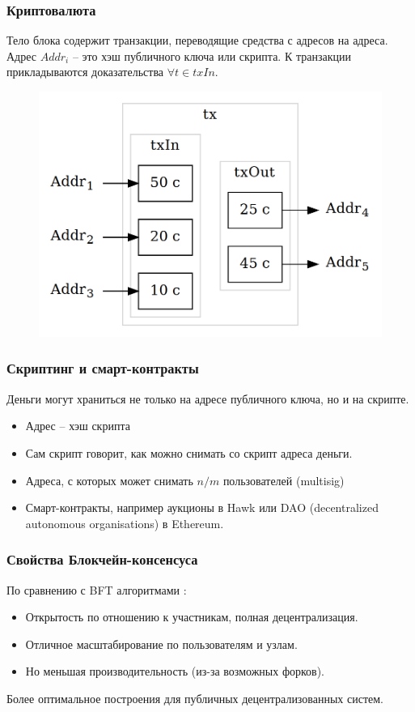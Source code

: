 \documentclass[11pt,handout,pdf,hyperref={unicode}]{beamer}
\begin{document}
\begin{frame}
  \frametitle{Криптовалюта}

  Тело блока содержит транзакции, переводящие средства с адресов на
  адреса. Адрес $Addr_i$ -- это хэш публичного ключа или скрипта. К
  транзакции прикладываются доказательства $\forall t \in txIn$.

  \begin{figure}[t]
  \includegraphics[scale=0.2]{tx_example}
  \centering
  \end{figure}
\end{frame}

\begin{frame}
  \frametitle{Скриптинг и смарт-контракты}

  Деньги могут храниться не только на адресе публичного ключа, но и на скрипте.
  \begin{itemize}
  \item Адрес -- хэш скрипта
  \item Сам скрипт говорит, как можно снимать со скрипт адреса деньги.
  \item Адреса, с которых может снимать $n/m$ пользователей (multisig)
  \item Смарт-контракты, например аукционы в Hawk \parencite{kosba2016hawk}
    или DAO (decentralized autonomous organisations) в Ethereum.
  \end{itemize}
\end{frame}


\begin{frame}
  \frametitle{Свойства Блокчейн-консенсуса}
  По сравнению с BFT алгоритмами \parencite{powbftquest}:
  \begin{itemize}
  \item Открытость по отношению к участникам, полная децентрализация.
  \item Отличное масштабирование по пользователям и узлам.
  \item Но меньшая производительность (из-за возможных форков).
  \end{itemize}

  Более оптимальное построения для публичных децентрализованных
  систем.
\end{frame}
\end{document}
